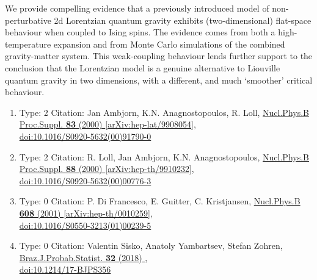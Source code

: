 \documentclass[a4paper,10pt]{article}
\begin{document}
\begin{enumerate}
We provide compelling evidence that a previously introduced model of non-perturbative 2d Lorentzian quantum gravity exhibits (two-dimensional) flat-space behaviour when coupled to Ising spins. The evidence comes from both a high-temperature expansion and from Monte Carlo simulations of the combined gravity-matter system. This weak-coupling behaviour lends further support to the conclusion that the Lorentzian model is a genuine alternative to Liouville quantum gravity in two dimensions, with a different, and much `smoother' critical behaviour.
\begin{enumerate}
  \item Type: 2 Citation: Jan Ambjorn, K.N. Anagnostopoulos, R. Loll, \href{https://www.doi.org/10.1016/S0920-5632(00)91790-0}{Nucl.Phys.B Proc.Suppl. {\bf 83} (2000) }  \href{https://arxiv.org/abs/hep-lat/9908054}{[arXiv:hep-lat/9908054]},\\\href{https://www.doi.org/10.1016/S0920-5632(00)91790-0}{doi:10.1016/S0920-5632(00)91790-0}
  \item Type: 2 Citation: R. Loll, Jan Ambjorn, K.N. Anagnostopoulos, \href{https://www.doi.org/10.1016/S0920-5632(00)00776-3}{Nucl.Phys.B Proc.Suppl. {\bf 88} (2000) }  \href{https://arxiv.org/abs/hep-th/9910232}{[arXiv:hep-th/9910232]},\\\href{https://www.doi.org/10.1016/S0920-5632(00)00776-3}{doi:10.1016/S0920-5632(00)00776-3}
  \item Type: 0 Citation: P. Di Francesco, E. Guitter, C. Kristjansen, \href{https://www.doi.org/10.1016/S0550-3213(01)00239-5}{Nucl.Phys.B {\bf 608} (2001) }  \href{https://arxiv.org/abs/hep-th/0010259}{[arXiv:hep-th/0010259]},\\\href{https://www.doi.org/10.1016/S0550-3213(01)00239-5}{doi:10.1016/S0550-3213(01)00239-5}
  \item Type: 0 Citation: Valentin Sisko, Anatoly Yambartsev, Stefan Zohren, \href{https://www.doi.org/10.1214/17-BJPS356}{Braz.J.Probab.Statist. {\bf 32} (2018) },\\\href{https://www.doi.org/10.1214/17-BJPS356}{doi:10.1214/17-BJPS356}

\end{enumerate}
\end{enumerate}
\end{document}
